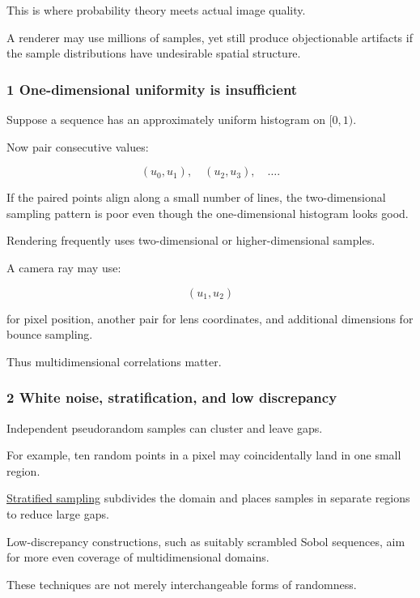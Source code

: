 This is where probability theory meets actual image quality.

A renderer may use millions of samples, yet still produce objectionable artifacts if the sample distributions have undesirable spatial structure.

\subsubsection{1 One-dimensional uniformity is insufficient}\label{02-foundations-ii-ch029-one-dimensional-uniformity-is-insufficient}

Suppose a sequence has an approximately uniform histogram on \([0,1)\).

Now pair consecutive values:

\[
 (u_0,u_1),\quad(u_2,u_3),\quad\ldots.
\]

If the paired points align along a small number of lines, the two-dimensional sampling pattern is poor even though the one-dimensional histogram looks good.

Rendering frequently uses two-dimensional or higher-dimensional samples.

A camera ray may use:

\[
 (u_1,u_2)
\]

for pixel position, another pair for lens coordinates, and additional dimensions for bounce sampling.

Thus multidimensional correlations matter.

\subsubsection{2 White noise, stratification, and low discrepancy}\label{02-foundations-ii-ch029-white-noise-stratification-and-low-discrepancy}

Independent pseudorandom samples can cluster and leave gaps.

For example, ten random points in a pixel may coincidentally land in one small region.

\hyperref[02-foundations-ii-ch029-a-computer-produces-deterministic-pseudorandom-sequences]{Stratified sampling} subdivides the domain and places samples in separate regions to reduce large gaps.

Low-discrepancy constructions, such as suitably scrambled Sobol sequences, aim for more even coverage of multidimensional domains.

These techniques are not merely interchangeable forms of randomness.

